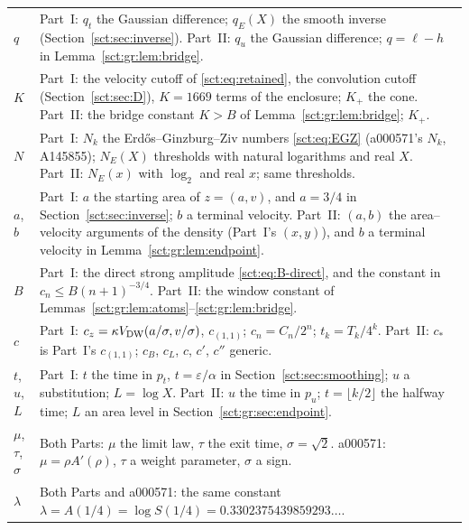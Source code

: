 \documentclass[11pt,letterpaper]{article}
\theoremstyle{definition}\newtheorem{remark}[theorem]{Remark}
\begin{document}
\begin{longtable}{@{}>{\raggedright\arraybackslash}p{} >{\raggedright\arraybackslash}p{}@{}}
$q$ & Part~I: $q_t$ the Gaussian difference; $q_E(X)$ the smooth inverse (Section~\ref{sct:sec:inverse}). Part~II: $q_u$ the Gaussian difference; $q=\ell-h$ in Lemma~\ref{sct:gr:lem:bridge}.\\
$K$ & Part~I: the velocity cutoff of \eqref{sct:eq:retained}, the convolution cutoff (Section~\ref{sct:sec:D}), $K=1669$ terms of the enclosure; $K_+$ the cone. Part~II: the bridge constant $K>B$ of Lemma~\ref{sct:gr:lem:bridge}; $K_+$.\\
$N$ & Part~I: $N_k$ the Erd\H{o}s--Ginzburg--Ziv numbers \eqref{sct:eq:EGZ} (a000571's $N_k$, A145855); $N_E(X)$ thresholds with natural logarithms and real $X$. Part~II: $N_E(x)$ with $\log_2$ and real $x$; same thresholds.\\
$a$, $b$ & Part~I: $a$ the starting area of $z=(a,v)$, and $a=3/4$ in Section~\ref{sct:sec:inverse}; $b$ a terminal velocity. Part~II: $(a,b)$ the area--velocity arguments of the density (Part~I's $(x,y)$), and $b$ a terminal velocity in Lemma~\ref{sct:gr:lem:endpoint}.\\
$B$ & Part~I: the direct strong amplitude \eqref{sct:eq:B-direct}, and the constant in $c_n\le B(n+1)^{-3/4}$. Part~II: the window constant of Lemmas~\ref{sct:gr:lem:atoms}--\ref{sct:gr:lem:bridge}.\\
$c$ & Part~I: $c_z=\kappa V_{\mathrm{DW}}(a/\sigma,v/\sigma)$, $c_{(1,1)}$; $c_n=C_n/2^n$; $t_k=T_k/4^k$. Part~II: $c_*$ is Part~I's $c_{(1,1)}$; $c_B$, $c_L$, $c$, $c'$, $c''$ generic.\\
$t$, $u$, $L$ & Part~I: $t$ the time in $p_t$, $t=\varepsilon/\alpha$ in Section~\ref{sct:sec:smoothing}; $u$ a substitution; $L=\log X$. Part~II: $u$ the time in $p_u$; $t=\lfloor k/2\rfloor$ the halfway time; $L$ an area level in Section~\ref{sct:gr:sec:endpoint}.\\
$\mu$, $\tau$, $\sigma$ & Both Parts: $\mu$ the limit law, $\tau$ the exit time, $\sigma=\sqrt2$. a000571: $\mu=\rho A'(\rho)$, $\tau$ a weight parameter, $\sigma$ a sign.\\
$\lambda$ & Both Parts and a000571: the same constant $\lambda=A(1/4)=\log S(1/4)=0.3302375439859293\ldots$.\\
\bottomrule
\end{longtable}
\endgroup
\end{document}
